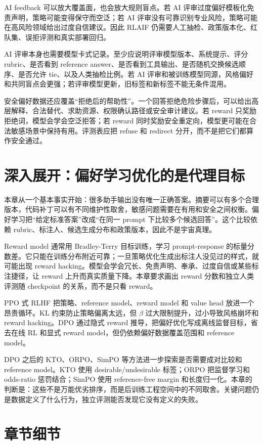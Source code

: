 \documentclass[UTF8,zihao=-4,openany]{ctexbook}
\begin{document}
AI feedback 可以放大覆盖面，也会放大规则盲点。若 AI 评审过度偏好模板化免责声明，策略可能变得保守而空泛；若 AI 评审没有可靠识别专业风险，策略可能在高风险领域给出过度自信建议。因此 RLAIF 仍需要人工抽检、政策版本化、红队集、误拒评测和真实部署回归。

AI 评审本身也需要模型卡式记录。至少应说明评审模型版本、系统提示、评分 rubric、是否看到 reference answer、是否看到工具输出、是否随机交换候选顺序、是否允许 tie、以及人类抽检比例。若 AI 评审和被训练模型同源，风格偏好和共同盲点会更强；若评审模型更新，旧标签和新标签不能无条件混用。

安全偏好数据还应覆盖“拒绝后的帮助性”。一个回答拒绝危险步骤后，可以给出高层解释、合法替代、求助资源、权限确认路径或安全审计建议。若 reward 只奖励拒绝词，模型会学会空泛拒答；若 reward 同时奖励安全重定向，模型更可能在合法敏感场景中保持有用。评测表应把 refuse 和 redirect 分开，而不是把它们都算作安全通过。

\section{深入展开：偏好学习优化的是代理目标}
本章从一个基本事实开始：很多助手输出没有唯一正确答案。摘要可以有多个合理版本，代码补丁可以有不同维护性取舍，敏感问题需要在有用和安全之间权衡。偏好学习把“给定标准答案”改成“在同一 prompt 下比较多个候选回答”。这个比较依赖 rubric、标注人、候选生成分布和政策版本，因此不是宇宙真理。

Reward model 通常用 Bradley-Terry 目标训练，学习 prompt-response 的标量分数差。它只能在训练分布附近可靠；一旦策略优化生成出标注人没见过的样式，就可能出现 reward hacking。模型会学会冗长、免责声明、奉承、过度自信或某些标注捷径，让 reward 上升而真实质量下降。本章要求画出 reward 分数和独立人类评测随 checkpoint 的关系，而不是只看 reward。

PPO 式 RLHF 把策略、reference model、reward model 和 value head 放进一个昂贵循环。KL 约束防止策略偏离太远，但 $\beta$ 过大限制提升，过小导致风格崩坏和 reward hacking。DPO 通过隐式 reward 推导，把偏好优化写成离线监督目标，省去在线 RL 和显式 reward model，但仍依赖偏好数据覆盖范围和 reference model。

DPO 之后的 KTO、ORPO、SimPO 等方法进一步探索是否需要成对比较和 reference model。KTO 使用 desirable/undesirable 标签；ORPO 把监督学习和 odds-ratio 惩罚结合；SimPO 使用 reference-free margin 和长度归一化。本章的判断是：这些不是万能优劣排序，而是后训练工程空间中的不同取舍。关键问题仍是数据定义了什么行为，独立评测能否发现它没有定义的失败。

\section{章节细节}
\end{document}
